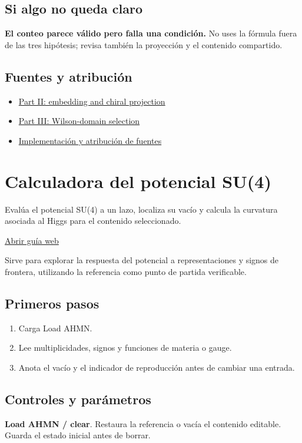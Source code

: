 \documentclass[11pt,a4paper]{article}
\begin{document}
\subsection*{Si algo no queda claro}
\textbf{El conteo parece válido pero falla una condición.} No uses la fórmula fuera de las tres hipótesis; revisa también la proyección y el contenido compartido.

\subsection*{Fuentes y atribución}
\begin{itemize}
\item \href{https://karlesmarin.github.io/ghu-explorer/papers/part-ii/index.html}{Part II: embedding and chiral projection}
\item \href{https://karlesmarin.github.io/ghu-explorer/papers/part-iii/index.html}{Part III: Wilson-domain selection}
\item \href{https://github.com/karlesmarin/ghu-lab/blob/main/src/sections/selection_section.js}{Implementación y atribución de fuentes}
\end{itemize}
\section{Calculadora del potencial SU(4)}
Evalúa el potencial SU(4) a un lazo, localiza su vacío y calcula la curvatura asociada al Higgs para el contenido seleccionado.

\href{https://karlesmarin.github.io/ghu-explorer/guide/es/calculator/index.html}{Abrir guía web}

Sirve para explorar la respuesta del potencial a representaciones y signos de frontera, utilizando la referencia como punto de partida verificable.
\subsection*{Primeros pasos}
\begin{enumerate}
\item Carga Load AHMN.
\item Lee multiplicidades, signos y funciones de materia o gauge.
\item Anota el vacío y el indicador de reproducción antes de cambiar una entrada.
\end{enumerate}
\subsection*{Controles y parámetros}
\textbf{Load AHMN / clear}. Restaura la referencia o vacía el contenido editable. Guarda el estado inicial antes de borrar.
\end{document}
